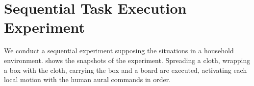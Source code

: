 \section{Sequential Task Execution Experiment}
\label{sec:ex}
We conduct a sequential experiment supposing the situations in a household environment.
 shows the snapshots of the experiment. Spreading a cloth, wrapping a box with the cloth, carrying the box and a board are executed, activating each local motion with the human aural commands in order.




